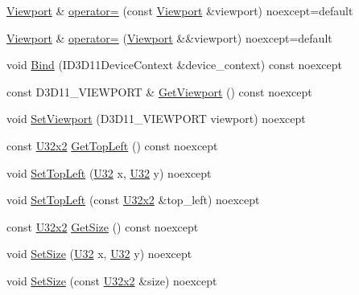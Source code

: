 \begin{DoxyCompactItemize}
\item 
\hyperlink{classmage_1_1rendering_1_1_viewport}{Viewport} \& \hyperlink{classmage_1_1rendering_1_1_viewport_afc42613270537b92aa837455b4c154f0}{operator=} (const \hyperlink{classmage_1_1rendering_1_1_viewport}{Viewport} \&viewport) noexcept=default
\item 
\hyperlink{classmage_1_1rendering_1_1_viewport}{Viewport} \& \hyperlink{classmage_1_1rendering_1_1_viewport_a62b0439861e78c3718f2b29339ec7226}{operator=} (\hyperlink{classmage_1_1rendering_1_1_viewport}{Viewport} \&\&viewport) noexcept=default
\item 
void \hyperlink{classmage_1_1rendering_1_1_viewport_a8aeb392ce46ab413d607cdea36033e21}{Bind} (I\+D3\+D11\+Device\+Context \&device\+\_\+context) const noexcept
\item 
const D3\+D11\+\_\+\+V\+I\+E\+W\+P\+O\+RT \& \hyperlink{classmage_1_1rendering_1_1_viewport_a9b931e5491d44459f598868eee59f1cc}{Get\+Viewport} () const noexcept
\item 
void \hyperlink{classmage_1_1rendering_1_1_viewport_a641dc22ff2ea12c7f3164b704e9ea479}{Set\+Viewport} (D3\+D11\+\_\+\+V\+I\+E\+W\+P\+O\+RT viewport) noexcept
\item 
const \hyperlink{namespacemage_a88e05bff0300120c013285d3dcad95c5}{U32x2} \hyperlink{classmage_1_1rendering_1_1_viewport_ad87e35df4d1f9ff3208d82c9af565b4d}{Get\+Top\+Left} () const noexcept
\item 
void \hyperlink{classmage_1_1rendering_1_1_viewport_a281e2fdd022aa9714741f5291be1c6ef}{Set\+Top\+Left} (\hyperlink{namespacemage_a41c104c036fba3756a74e19f793eeaa1}{U32} x, \hyperlink{namespacemage_a41c104c036fba3756a74e19f793eeaa1}{U32} y) noexcept
\item 
void \hyperlink{classmage_1_1rendering_1_1_viewport_a22ea70a6e01b8328ba94d90e374e85cb}{Set\+Top\+Left} (const \hyperlink{namespacemage_a88e05bff0300120c013285d3dcad95c5}{U32x2} \&top\+\_\+left) noexcept
\item 
const \hyperlink{namespacemage_a88e05bff0300120c013285d3dcad95c5}{U32x2} \hyperlink{classmage_1_1rendering_1_1_viewport_a6e7381d208af8d079e93d8e04739eb36}{Get\+Size} () const noexcept
\item 
void \hyperlink{classmage_1_1rendering_1_1_viewport_af0db77599e1f1ec246ca3f1440ebb0ac}{Set\+Size} (\hyperlink{namespacemage_a41c104c036fba3756a74e19f793eeaa1}{U32} x, \hyperlink{namespacemage_a41c104c036fba3756a74e19f793eeaa1}{U32} y) noexcept
\item 
void \hyperlink{classmage_1_1rendering_1_1_viewport_a8b5578069d4e4afa99ca4a0b89541025}{Set\+Size} (const \hyperlink{namespacemage_a88e05bff0300120c013285d3dcad95c5}{U32x2} \&size) noexcept

\end{DoxyCompactItemize}
